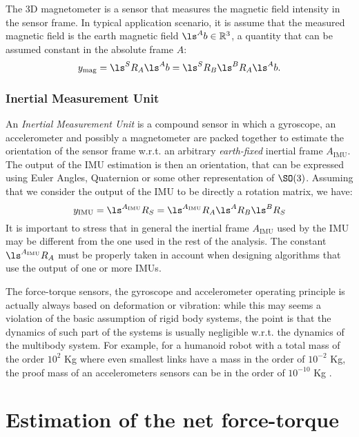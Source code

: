 The 3D magnetometer is a sensor that measures the magnetic field intensity in the sensor frame. In typical application scenario, it is assume that the measured magnetic field is the earth magnetic field $\ls^A b \in \mathbb{R}^3$, a quantity that can be assumed constant in the absolute frame $A$:
\begin{equation}
y_{\text{mag}} = \ls^S R_A \ls^A b = \ls^S R_B \ls^B R_A \ls^A b .
\end{equation}

\subsubsection{Inertial Measurement Unit}

An \emph{Inertial Measurement Unit} is a compound sensor in which a gyroscope, an accelerometer and possibly a magnetometer are packed together to estimate the orientation of the sensor frame w.r.t. an arbitrary \emph{earth-fixed} inertial frame $A_{\text{IMU}}$. The output of the IMU estimation is then an orientation, that can be expressed using Euler Angles, Quaternion or some other representation of $\SO(3)$. Assuming that we consider the output of the IMU to be directly a rotation matrix, we have:
\begin{equation}
y_{\text{IMU}} = \ls^{A_{\text{IMU}}} R_S = \ls^{A_{\text{IMU}}} R_A \ls^A R_B \ls^B R_S
\end{equation}
It is important to stress that in general the inertial frame $A_{\text{IMU}}$ used by the IMU may be different from the one used in the rest of the analysis. The constant $\ls^{A_{\text{IMU}}} R_A$ must be properly taken in account when designing algorithms that use the output of one or more IMUs.

\begin{remark}
The force-torque sensors, the gyroscope and accelerometer operating principle is actually always based on deformation or vibration: while this may seems a violation of the basic assumption of rigid body systems, the point is that the dynamics of such part of the systems is usually negligible w.r.t. the dynamics of the multibody system. 
For example, for a humanoid robot with a total mass of the order $10^2$ \si{Kg} where even smallest links have a mass in the order of $10^{-2}$ \si{Kg}, the proof mass of an accelerometers sensors can be in the order of $10^{-10}$ \si{Kg} \citep{andrejavsic2008mems}.
\end{remark}


\section{Estimation of the net force-torque}
\label{sec:net-force-torque-estimation}

